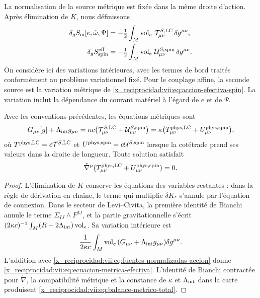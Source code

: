 \begin{HMTCompactSection}
La normalisation de la source métrique est fixée dans la même droite d'action. Après élimination de \(K\), nous définissons
\begin{align}
 \delta_g S_{\rm m}[e,\mathring\omega,\Psi]
 &=-\tfrac12\int_M\operatorname{vol}_e\,
                   \mathcal T^{S,\rm LC}_{\mu\nu}\,\delta g^{\mu\nu},
 \\
 \delta_g S_{\rm spin}^{\rm eff}
 &=-\tfrac12\int_M\operatorname{vol}_e\,
                   \mathcal U^{S,\rm spin}_{\mu\nu}\,\delta g^{\mu\nu}.
 \label{x_reciprocidad:vii:eq:fuentes-normalizadas-accion}
\end{align}
On considère ici des variations intérieures, avec les termes de bord
traités conformément au problème variationnel fixé. Pour le couplage
affine, la seconde source est la variation métrique de
\eqref{x_reciprocidad:vii:eq:accion-efectiva-spin}. La variation inclut la dépendance
du courant matériel à l'égard de \(e\) et de \(\Psi\).

\begin{proposition}
\label{x_reciprocidad:vii:prop:fuente-metrica-balance}
Avec les conventions précédentes, les équations métriques sont
\begin{equation}
 G_{\mu\nu}[g]+\Lambda_{\rm int}g_{\mu\nu}
 =\kappa c\bigl(\mathcal T^{S,\rm LC}_{\mu\nu}
                    +\mathcal U^{S,\rm spin}_{\mu\nu}\bigr)
 =\kappa\bigl(T^{\rm phys,LC}_{\mu\nu}
                    +U^{\rm phys,spin}_{\mu\nu}\bigr),
 \label{x_reciprocidad:vii:eq:ecuacion-metrica-efectiva}
\end{equation}
où \(T^{\rm phys,LC}=c\mathcal T^{S,\rm LC}\) et \(U^{\rm phys,spin}=c\mathcal U^{S,\rm spin}\) lorsque la cotétrade prend ses valeurs dans la droite de longueur. Toute solution satisfait
\begin{equation}
 \mathring\nabla^\mu
   (T^{\rm phys,LC}_{\mu\nu}+U^{\rm phys,spin}_{\mu\nu})=0.
 \label{x_reciprocidad:vii:eq:balance-metrico-total}
\end{equation}
\end{proposition}
\begin{proof}
L'élimination de \(K\) conserve les équations des variables
restantes : dans la règle de dérivation en chaîne, le terme qui multiplie
\(\delta K_*\) s'annule par l'équation de connexion. Dans le secteur
de Levi--Civita, la première identité de Bianchi annule le terme
\(\Sigma_{IJ}\wedge F^{IJ}\), et la partie gravitationnelle s'écrit
\((2\kappa c)^{-1}\int_M(R-2\Lambda_{\rm int})\operatorname{vol}_e\).
Sa variation intérieure est
\[
 \frac1{2\kappa c}\int_M\operatorname{vol}_e\,
        (G_{\mu\nu}+\Lambda_{\rm int}g_{\mu\nu})\delta g^{\mu\nu}.
\]
L'addition avec \eqref{x_reciprocidad:vii:eq:fuentes-normalizadas-accion} donne \eqref{x_reciprocidad:vii:eq:ecuacion-metrica-efectiva}. L'identité de Bianchi contractée pour \(\mathring\nabla\), la compatibilité métrique et la constance de \(\kappa\) et \(\Lambda_{\rm int}\) dans la carte produisent \eqref{x_reciprocidad:vii:eq:balance-metrico-total}.
\end{proof}


\end{HMTCompactSection}
